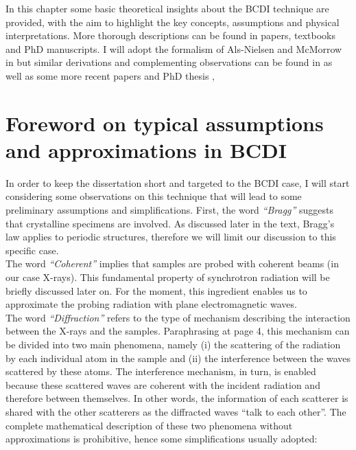 
In this chapter some basic theoretical insights about the BCDI technique are provided, with the aim to highlight the key 
concepts, assumptions and physical interpretations. More thorough descriptions can be found in papers, textbooks 
and PhD manuscripts. I will adopt the formalism of Als-Nielsen and McMorrow in \cite{alsnielsen_mcmorrow2011} but similar 
derivations and complementing observations can be found in \cite{guinier1994, paganin2006coherent} as well as some more recent papers \cite{vartanyants2013coherentxraydiffractionimaging} 
and PhD thesis \cite{dupraz:tel-01285735, girard:tel-02906931}
, 

\section{Foreword on typical assumptions and approximations in BCDI}
In order to keep the dissertation short and targeted to the BCDI case, I will start considering some observations on this
technique that will lead to some preliminary assumptions and simplifications. First, the word \textit{``Bragg''} suggests that 
crystalline specimens are involved. As discussed later in the text, Bragg's law applies to periodic structures, therefore 
we will limit our discussion to this specific case. \\
The word \textit{``Coherent''} implies that samples are probed with coherent beams (in our case X-rays). This fundamental property of 
synchrotron radiation will be briefly discussed later on. For the moment, this ingredient enables us to approximate the 
probing radiation with plane electromagnetic waves. \\
The word \textit{``Diffraction''} refers to the type of mechanism describing the interaction between the X-rays and the 
samples. Paraphrasing \cite{guinier1994} at page 4, this mechanism can be divided into two main phenomena, namely (i) 
the scattering of the radiation by each individual atom in the sample and (ii) the interference between the waves scattered 
by these atoms. The interference mechanism, in turn, is enabled because these scattered waves are coherent with the incident 
radiation and therefore between themselves. In other words, the information of each scatterer is shared with the other scatterers 
as the diffracted waves ``talk to each other''. The complete mathematical description of these two phenomena without approximations 
is prohibitive, hence some simplifications usually adopted: 

